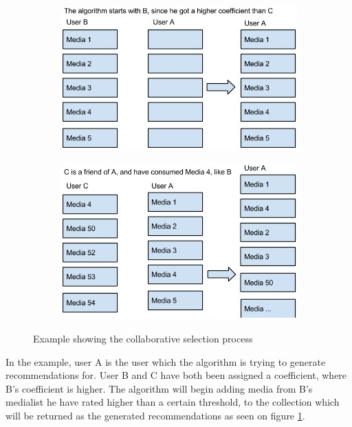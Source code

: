 \begin{figure}[H]
\centering
\begin{subfigure}{.5\textwidth}
  \centering
  \includegraphics[width=.9\linewidth]{Images/CollaborativeRecExample1.png}
  \caption{}
  \label{fig:collarec1}
\end{subfigure}%
\begin{subfigure}{.5\textwidth}
  \centering
  \includegraphics[width=.9\linewidth]{Images/CollaborativeRecExample2.png}
  \caption{}
  \label{fig:collarec2}
\end{subfigure}
\caption{Example showing the collaborative selection process}
\label{CollaEx}
\end{figure}

In the example, user A is the user which the algorithm is trying to generate recommendations for. User B and C have both been assigned a coefficient, where B’s coefficient is higher. The algorithm will begin adding media from B’s medialist he have rated higher than a certain threshold, to the collection which will be returned as the generated recommendations as seen on figure \ref{fig:collarec1}.

